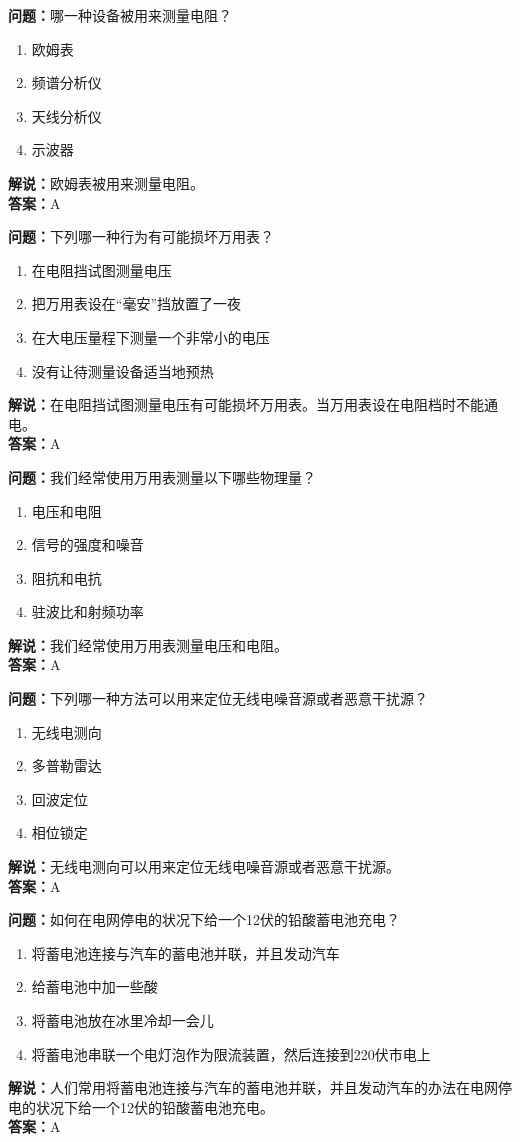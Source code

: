 \documentclass[UTF8]{ctexbook}
\begin{document}
\textbf{问题：}哪一种设备被用来测量电阻？
\begin{enumerate}[label=\Alph*), leftmargin=3em]
  \item 欧姆表
  \item 频谱分析仪
  \item 天线分析仪
  \item 示波器
\end{enumerate}
\textbf{解说：}欧姆表被用来测量电阻。\\
\textbf{答案：}A

\textbf{问题：}下列哪一种行为有可能损坏万用表？
\begin{enumerate}[label=\Alph*), leftmargin=3em]
  \item 在电阻挡试图测量电压
  \item 把万用表设在“毫安”挡放置了一夜
  \item 在大电压量程下测量一个非常小的电压
  \item 没有让待测量设备适当地预热
\end{enumerate}
\textbf{解说：}在电阻挡试图测量电压有可能损坏万用表。当万用表设在电阻档时不能通电。\\
\textbf{答案：}A

\textbf{问题：}我们经常使用万用表测量以下哪些物理量？
\begin{enumerate}[label=\Alph*), leftmargin=3em]
  \item 电压和电阻
  \item 信号的强度和噪音
  \item 阻抗和电抗
  \item 驻波比和射频功率
\end{enumerate}
\textbf{解说：}我们经常使用万用表测量电压和电阻。\\
\textbf{答案：}A

\textbf{问题：}下列哪一种方法可以用来定位无线电噪音源或者恶意干扰源？
\begin{enumerate}[label=\Alph*), leftmargin=3em]
  \item 无线电测向
  \item 多普勒雷达
  \item 回波定位
  \item 相位锁定
\end{enumerate}
\textbf{解说：}无线电测向可以用来定位无线电噪音源或者恶意干扰源。\\
\textbf{答案：}A

\textbf{问题：}如何在电网停电的状况下给一个12伏的铅酸蓄电池充电？
\begin{enumerate}[label=\Alph*), leftmargin=3em]
  \item 将蓄电池连接与汽车的蓄电池并联，并且发动汽车
  \item 给蓄电池中加一些酸
  \item 将蓄电池放在冰里冷却一会儿
  \item 将蓄电池串联一个电灯泡作为限流装置，然后连接到220伏市电上
\end{enumerate}
\textbf{解说：}人们常用将蓄电池连接与汽车的蓄电池并联，并且发动汽车的办法在电网停电的状况下给一个12伏的铅酸蓄电池充电。\\
\textbf{答案：}A
\end{document}
